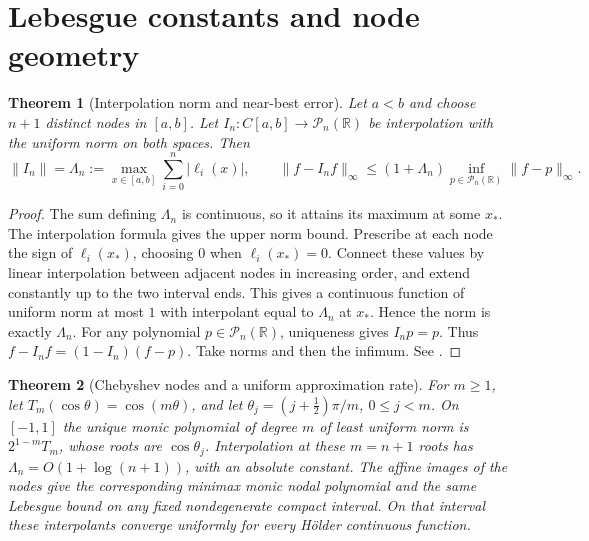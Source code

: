 \documentclass[11pt,oneside,openany]{book}
\theoremstyle{plain}
\newtheorem{theorem}{Theorem}[chapter]
\theoremstyle{definition}
\theoremstyle{remark}
\begin{document}
\section{Lebesgue constants and node geometry}

\begin{theorem}[Interpolation norm and near-best error]\label{p206:W52}
Let \(a<b\) and choose \(n+1\) distinct nodes in \([a,b]\).
Let \(I_n:C[a,b]\to\mathcal P_n(\mathbb R)\) be interpolation
with the uniform norm on both spaces. Then
\[
 \lVert I_n\rVert=\Lambda_n
   :=\max_{x\in[a,b]}\sum_{i=0}^n|\ell_i(x)|,
 \qquad
 \lVert f-I_nf\rVert_\infty
 \le(1+\Lambda_n)\inf_{p\in\mathcal P_n(\mathbb R)}
                   \lVert f-p\rVert_\infty .
\]
\end{theorem}

\begin{proof}
The sum defining \(\Lambda_n\) is continuous, so it attains its
maximum at some \(x_*\). The interpolation formula gives the upper
norm bound. Prescribe at each node the sign of \(\ell_i(x_*)\),
choosing \(0\) when \(\ell_i(x_*)=0\). Connect these values by
linear interpolation between adjacent nodes in increasing order,
and extend constantly up to the two interval ends. This gives a
continuous function of uniform norm at most \(1\) with interpolant
equal to \(\Lambda_n\) at \(x_*\). Hence the norm is exactly
\(\Lambda_n\). For any polynomial \(p\in\mathcal P_n(\mathbb R)\),
uniqueness gives \(I_np=p\). Thus \(f-I_nf=(1-I_n)(f-p)\).
Take norms and then the infimum. See \cite[Chapter 15]{trefapprox}.
\end{proof}

\begin{theorem}[Chebyshev nodes and a uniform approximation rate]\label{p206:W53}
For \(m\ge1\), let \(T_m(\cos\theta)=\cos(m\theta)\), and let
\(\theta_j=(j+\tfrac12)\pi/m\), \(0\le j<m\). On \([-1,1]\) the
unique monic polynomial of degree \(m\) of least uniform norm is
\(2^{1-m}T_m\), whose roots are \(\cos\theta_j\).
Interpolation at these \(m=n+1\) roots has
\(\Lambda_n=O(1+\log(n+1))\), with an absolute constant.
The affine images of the nodes give the corresponding minimax
monic nodal polynomial and the same Lebesgue bound on any fixed
nondegenerate compact interval. On that interval these interpolants
converge uniformly for every Hölder continuous function.
\end{theorem}
\end{document}
